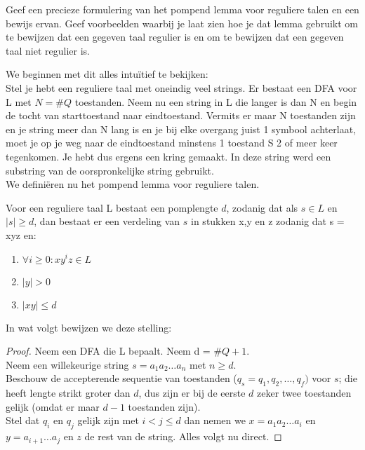 \begin{question}
Geef een precieze formulering van het pompend lemma voor reguliere talen en een bewijs ervan. Geef voorbeelden waarbij je laat zien hoe je dat lemma gebruikt om te bewijzen dat een gegeven taal regulier is en om te bewijzen dat een gegeven taal niet regulier is.
\end{question}

We beginnen met dit alles intu\"itief te bekijken:\\
Stel je hebt een reguliere taal met oneindig veel strings. Er bestaat een DFA voor L met $N = \#Q$ toestanden. Neem nu een string in L die langer is dan N en begin de tocht van starttoestand naar eindtoestand. Vermits er maar N toestanden zijn en je string meer dan N lang is en je bij elke overgang juist 1 symbool achterlaat, moet je op je weg naar de eindtoestand minstens 1 toestand S 2 of meer keer tegenkomen. Je hebt dus ergens een kring gemaakt. In deze string werd een substring van de oorspronkelijke string gebruikt.\\
We defini\"eren nu het pompend lemma voor reguliere talen.

\begin{theorem}
Voor een reguliere taal L bestaat een pomplengte $d$, zodanig dat als $s \in L$ en $|s| \geq d$, dan bestaat er een verdeling van $s$ in stukken x,y en z zodanig dat s = xyz en:
\begin{enumerate}
\item $\forall i \geq 0 : xy^iz \in L$
\item $|y| > 0$
\item $|xy| \leq d$
\end{enumerate}
\end{theorem}

In wat volgt bewijzen we deze stelling:

\begin{proof}
Neem een DFA die L bepaalt. Neem d = $\#Q+1$.\\
Neem een willekeurige string $s = a_1a_2 \hdots a_n$ met $n \geq d$. \\
Beschouw de accepterende sequentie van toestanden ($q_s = q_1,q_2,\hdots,q_f)$ voor $s$; die heeft lengte strikt groter dan $d$, dus zijn er bij de eerste $d$ zeker twee toestanden gelijk (omdat er maar $d-1$ toestanden zijn).\\
Stel dat $q_i$ en $q_j$ gelijk zijn met $i<j \leq d$ dan nemen we $x=a_1a_2\hdots a_i$ en $y=a_{i+1} \hdots a_j$ en $z$ de rest van de string. Alles volgt nu direct.
\end{proof}

